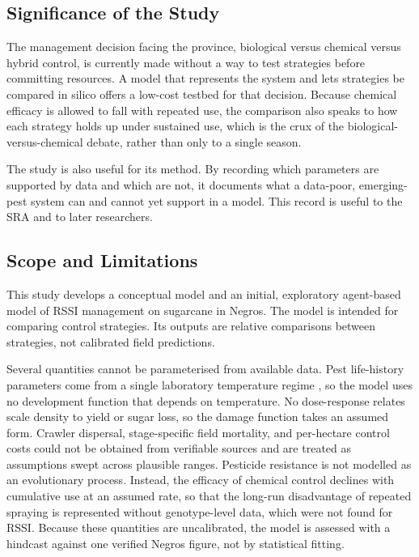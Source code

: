 \subsection{Significance of the Study}

The management decision facing the province, biological versus chemical versus hybrid control, is currently made without a way to test strategies before committing resources. A model that represents the system and lets strategies be compared in silico offers a low-cost testbed for that decision. Because chemical efficacy is allowed to fall with repeated use, the comparison also speaks to how each strategy holds up under sustained use, which is the crux of the biological-versus-chemical debate, rather than only to a single season.

The study is also useful for its method. By recording which parameters are supported by data and which are not, it documents what a data-poor, emerging-pest system can and cannot yet support in a model. This record is useful to the SRA and to later researchers.

\subsection{Scope and Limitations}

This study develops a conceptual model and an initial, exploratory agent-based model of RSSI management on sugarcane in Negros. The model is intended for comparing control strategies. Its outputs are relative comparisons between strategies, not calibrated field predictions.

Several quantities cannot be parameterised from available data. Pest life-history parameters come from a single laboratory temperature regime \citep{Guerrero2026}, so the model uses no development function that depends on temperature. No dose-response relates scale density to yield or sugar loss, so the damage function takes an assumed form. Crawler dispersal, stage-specific field mortality, and per-hectare control costs could not be obtained from verifiable sources and are treated as assumptions swept across plausible ranges. Pesticide resistance is not modelled as an evolutionary process. Instead, the efficacy of chemical control declines with cumulative use at an assumed rate, so that the long-run disadvantage of repeated spraying is represented without genotype-level data, which were not found for RSSI. Because these quantities are uncalibrated, the model is assessed with a hindcast against one verified Negros figure, not by statistical fitting.

